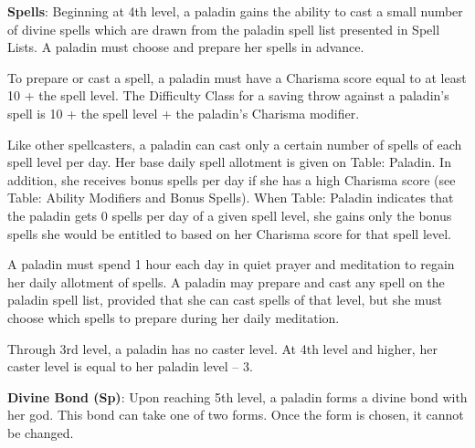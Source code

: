 \textbf{Spells}: Beginning at 4th level, a paladin gains the ability to cast a small number of divine spells which are drawn from the paladin spell list presented in Spell Lists. A paladin must choose and prepare her spells in advance.
				
To prepare or cast a spell, a paladin must have a Charisma score equal to at least 10 + the spell level. The Difficulty Class for a saving throw against a paladin's spell is 10 + the spell level + the paladin's Charisma modifier.
				
Like other spellcasters, a paladin can cast only a certain number of spells of each spell level per day. Her base daily spell allotment is given on Table: Paladin. In addition, she receives bonus spells per day if she has a high Charisma score (see Table: Ability Modifiers and Bonus Spells). When Table: Paladin indicates that the paladin gets 0 spells per day of a given spell level, she gains only the bonus spells she would be entitled to based on her Charisma score for that spell level.
				
A paladin must spend 1 hour each day in quiet prayer and meditation to regain her daily allotment of spells. A paladin may prepare and cast any spell on the paladin spell list, provided that she can cast spells of that level, but she must choose which spells to prepare during her daily meditation.
				
Through 3rd level, a paladin has no caster level. At 4th level and higher, her caster level is equal to her paladin level -- 3.
				
\textbf{Divine Bond (Sp)}: Upon reaching 5th level, a paladin forms a divine bond with her god. This bond can take one of two forms. Once the form is chosen, it cannot be changed.
				
